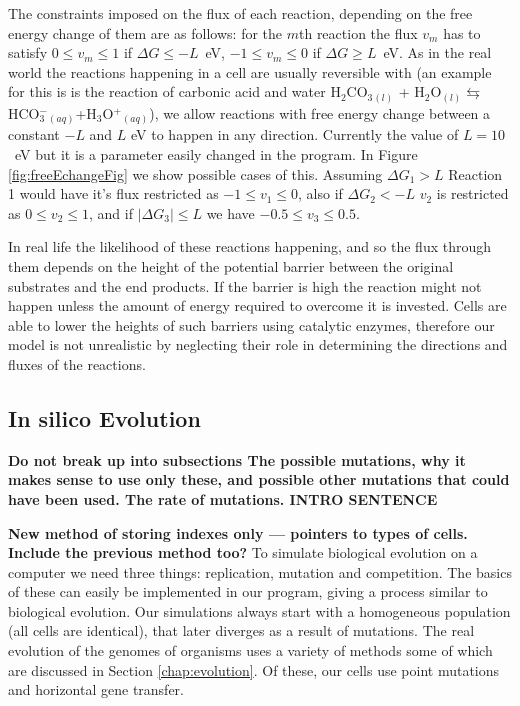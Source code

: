 \documentclass[10pt,a4paper]{article}
\begin{document}
	The constraints imposed on the flux of each reaction, depending on the free energy change of them are as follows: for the $m$th reaction the flux $v_m$ has to satisfy $0\leq v_m \leq 1 $ if $\Delta G \leq -L$~eV, $-1\leq v_m \leq 0 $ if $\Delta G \geq L$~eV. As in the real world the reactions happening in a cell are usually reversible with (an example for this is is the reaction of carbonic acid and water H$_2$CO$_3$$_{(l)}$ + H$_2$O$_{(l)} \leftrightarrows$ HCO$^-_3$$_{(aq)}$+H$_3$O$^+$$_{(aq)}$), we allow reactions with free energy change between a constant $-L$ and $L$ eV to happen in any direction. Currently the value of $L=10$~eV but it is a parameter easily changed in the program. In Figure \ref{fig:freeEchangeFig} we show possible cases of this. Assuming $\Delta G_1 > L$ Reaction 1 would have it's flux restricted as $-1\leq v_1 \leq 0$, also if $\Delta G_2 < -L$ $v_2$ is restricted as $0 \leq v_2 \leq 1$, and if $|\Delta G_3 | \leq L$ we have $-0.5 \leq v_3 \leq 0.5$. 

	In real life the likelihood of these reactions happening, and so the flux through them depends on the height of the potential barrier between the original substrates and the end products. If the barrier is high the reaction might not happen unless the amount of energy required to overcome it is invested. Cells are able to lower the heights of such barriers using catalytic enzymes, therefore our model is not unrealistic by neglecting their role in determining the directions and fluxes of the reactions. 

\subsection{In silico Evolution}
\label{sub:implementing evolution}
\textbf{
Do not break up into subsections
The possible mutations, why it makes sense to use only these, and possible other mutations that could have been used. The rate of mutations. 
INTRO SENTENCE}

\textbf{New method of storing indexes only --- pointers to types of cells. Include the previous method too?}
To simulate biological evolution on a computer we need three things: replication, mutation and competition. The basics of these can easily be implemented in our program, giving a process similar to biological evolution. Our simulations always start with a homogeneous population (all cells are identical), that later diverges as a result of mutations. The real evolution of the genomes of organisms uses a variety of methods some of which are discussed in Section \ref{chap:evolution}. Of these, our cells use point mutations and horizontal gene transfer.
	
\end{document}
